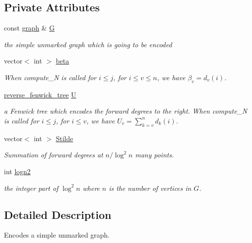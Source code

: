\subsection*{Private Attributes}
\begin{DoxyCompactItemize}
\item 
const \hyperlink{classgraph}{graph} \& \hyperlink{classgraph__encoder_a56d8ab1a423e192c6f80514ff5e5cfec}{G}
\begin{DoxyCompactList}\small\item\em the simple unmarked graph which is going to be encoded \end{DoxyCompactList}\item 
vector$<$ int $>$ \hyperlink{classgraph__encoder_a40880adecfd63fb86e94b4b0fc3f6bc2}{beta}
\begin{DoxyCompactList}\small\item\em When compute\+\_\+N is called for $i \leq j$, for $i \leq v \leq n$, we have $\beta_v = d_v(i)$. \end{DoxyCompactList}\item 
\hyperlink{classreverse__fenwick__tree}{reverse\+\_\+fenwick\+\_\+tree} \hyperlink{classgraph__encoder_a3314c40920f2ee132958a6b0ce7e7995}{U}
\begin{DoxyCompactList}\small\item\em a Fenwick tree which encodes the forward degrees to the right. When compute\+\_\+N is called for $i \leq j$, for $i \leq v$, we have $U_v = \sum_{k=v}^n d_k(i)$. \end{DoxyCompactList}\item 
vector$<$ int $>$ \hyperlink{classgraph__encoder_a342688a3fdee511b7fae3f155cfb10cf}{Stilde}
\begin{DoxyCompactList}\small\item\em Summation of forward degrees at $n / \log^2 n$ many points. \end{DoxyCompactList}\item 
int \hyperlink{classgraph__encoder_a27fde3a95a280304877b1e37fc4d8553}{logn2}
\begin{DoxyCompactList}\small\item\em the integer part of $\log^2 n$ where $n$ is the number of vertices in $G$. \end{DoxyCompactList}\end{DoxyCompactItemize}


\subsection{Detailed Description}
Encodes a simple unmarked graph. 

